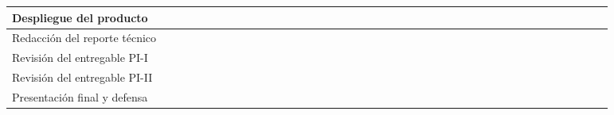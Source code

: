 \documentclass[12pt,letterpaper]{report}
\begin{document}
\begin{landscape}
\begin{minipage}[c][\textheight][c]{\linewidth}
{\begin{tabular}{|>{\raggedright\arraybackslash}p{4.6cm}|*{10}{cccc|}}
        \hline
        Despliegue del producto
        &  &  &  &  &  &  &  &  &  &  &  &  &  &  &  &  & \cellcolor{colorgris!25} & \cellcolor{colorgris!25} & \cellcolor{colorgris!25} & \cellcolor{colorgris!25} &  &  &  &  &  &  &  &  &  &  &  & \cellcolor{colorprimario!60} & \cellcolor{colorprimario!60} & \cellcolor{colorprimario!60} & \cellcolor{colorprimario!60} & \cellcolor{colorprimario!60} & \cellcolor{colorprimario!60} & \cellcolor{colorprimario!60} &  &  \\
        \hline
        Redacción del reporte técnico
        & \cellcolor{colorprimario!22} & \cellcolor{colorprimario!22} & \cellcolor{colorprimario!22} & \cellcolor{colorprimario!22} & \cellcolor{colorprimario!22} & \cellcolor{colorprimario!22} & \cellcolor{colorprimario!22} & \cellcolor{colorprimario!22} & \cellcolor{colorprimario!22} & \cellcolor{colorprimario!22} & \cellcolor{colorprimario!22} & \cellcolor{colorprimario!22} & \cellcolor{colorprimario!22} & \cellcolor{colorprimario!22} & \cellcolor{colorprimario!22} & \cellcolor{colorprimario!22} & \cellcolor{colorgris!25} & \cellcolor{colorgris!25} & \cellcolor{colorgris!25} & \cellcolor{colorgris!25} & \cellcolor{colorprimario!22} & \cellcolor{colorprimario!22} & \cellcolor{colorprimario!22} & \cellcolor{colorprimario!22} & \cellcolor{colorprimario!22} & \cellcolor{colorprimario!22} & \cellcolor{colorprimario!22} & \cellcolor{colorprimario!22} & \cellcolor{colorprimario!22} & \cellcolor{colorprimario!22} & \cellcolor{colorprimario!22} & \cellcolor{colorprimario!22} & \cellcolor{colorprimario!22} & \cellcolor{colorprimario!22} & \cellcolor{colorprimario!22} & \cellcolor{colorprimario!22} & \cellcolor{colorprimario!22} & \cellcolor{colorprimario!22} & \cellcolor{colorprimario!22} & \cellcolor{colorprimario!22} \\
        \hline
        Revisión del entregable PI-I
        &  &  &  &  &  &  &  &  &  &  &  &  &  &  &  & \cellcolor{colorsecundario!85} & \cellcolor{colorgris!25} & \cellcolor{colorgris!25} & \cellcolor{colorgris!25} & \cellcolor{colorgris!25} &  &  &  &  &  &  &  &  &  &  &  &  &  &  &  &  &  &  &  &  \\
        \hline
        Revisión del entregable PI-II
        &  &  &  &  &  &  &  &  &  &  &  &  &  &  &  &  & \cellcolor{colorgris!25} & \cellcolor{colorgris!25} & \cellcolor{colorgris!25} & \cellcolor{colorgris!25} &  &  &  &  &  &  &  &  &  &  &  &  &  &  &  & \cellcolor{colorsecundario!85} &  &  &  &  \\
        \hline
        Presentación final y defensa
        &  &  &  &  &  &  &  &  &  &  &  &  &  &  &  &  & \cellcolor{colorgris!25} & \cellcolor{colorgris!25} & \cellcolor{colorgris!25} & \cellcolor{colorgris!25} &  &  &  &  &  &  &  &  &  &  &  &  &  &  &  &  &  &  &  & \cellcolor{colorsecundario!85} \\
        \hline


\end{tabular}}
\end{minipage}
\end{landscape}
\end{document}
